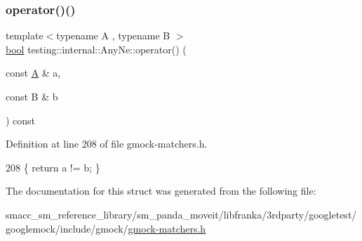 \subsubsection{\texorpdfstring{operator()()}{operator()()}}
{\footnotesize\ttfamily template$<$typename A , typename B $>$ \\
\hyperlink{classbool}{bool} testing\+::internal\+::\+Any\+Ne\+::operator() (\begin{DoxyParamCaption}\item[{const \hyperlink{namespacetesting_a5e9134d655d2fc9323902348083282e7}{A} \&}]{a,  }\item[{const B \&}]{b }\end{DoxyParamCaption}) const\hspace{0.3cm}{\ttfamily [inline]}}



Definition at line 208 of file gmock-\/matchers.\+h.


\begin{DoxyCode}
208 \{ \textcolor{keywordflow}{return} a != b; \}
\end{DoxyCode}


The documentation for this struct was generated from the following file\+:\begin{DoxyCompactItemize}
\item 
smacc\+\_\+sm\+\_\+reference\+\_\+library/sm\+\_\+panda\+\_\+moveit/libfranka/3rdparty/googletest/googlemock/include/gmock/\hyperlink{gmock-matchers_8h}{gmock-\/matchers.\+h}\end{DoxyCompactItemize}
